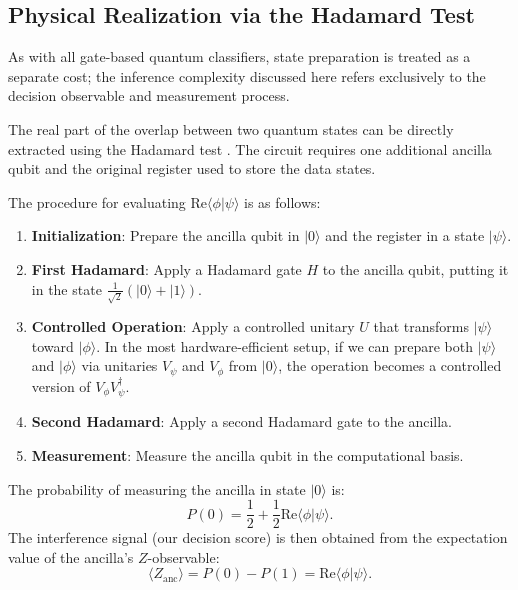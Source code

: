 \documentclass[conference]{IEEEtran}
\begin{document}
\subsection{Physical Realization via the Hadamard Test}

As with all gate-based quantum classifiers, state preparation is treated as a separate cost; the inference complexity discussed here refers exclusively to the decision observable and measurement process.

The real part of the overlap between two quantum states can be directly extracted using the Hadamard test \cite{ekert2002direct}. The circuit requires one additional ancilla qubit and the original register used to store the data states.

The procedure for evaluating $\mathrm{Re}\langle \phi | \psi \rangle$ is as follows:
\begin{enumerate}
    \item \textbf{Initialization}: Prepare the ancilla qubit in $|0\rangle$ and the register in a state $|\psi\rangle$.
    \item \textbf{First Hadamard}: Apply a Hadamard gate $H$ to the ancilla qubit, putting it in the state $\frac{1}{\sqrt{2}}(|0\rangle + |1\rangle)$.
    \item \textbf{Controlled Operation}: Apply a controlled unitary $U$ that transforms $|\psi\rangle$ toward $|\phi\rangle$. In the most hardware-efficient setup, if we can prepare both $|\psi\rangle$ and $|\phi\rangle$ via unitaries $V_\psi$ and $V_\phi$ from $|0\rangle$, the operation becomes a controlled version of $V_\phi V_\psi^\dagger$.
    \item \textbf{Second Hadamard}: Apply a second Hadamard gate to the ancilla.
    \item \textbf{Measurement}: Measure the ancilla qubit in the computational basis.
\end{enumerate}

The probability of measuring the ancilla in state $|0\rangle$ is:
\begin{equation}
P(0) = \frac{1}{2} + \frac{1}{2} \mathrm{Re}\langle \phi | \psi \rangle.
\end{equation}
The interference signal (our decision score) is then obtained from the expectation value of the ancilla's $Z$-observable:
\begin{equation}
\langle Z_{\text{anc}} \rangle = P(0) - P(1) = \mathrm{Re}\langle \phi | \psi \rangle.
\end{equation}
\end{document}
